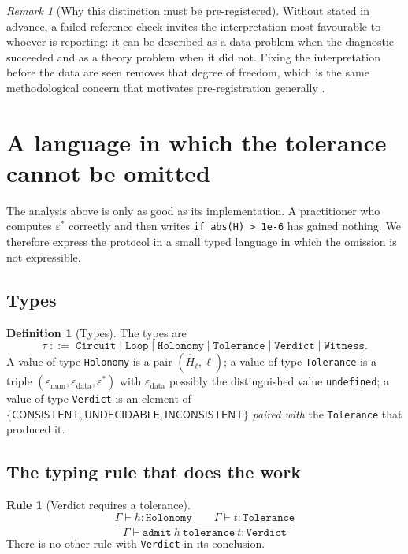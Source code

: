 \documentclass[11pt,twocolumn,a4paper]{article}
\theoremstyle{pstyle}
\theoremstyle{definition}
\newtheorem{definition}[theorem]{Definition}
\newtheorem{rulename}[theorem]{Rule}
\theoremstyle{remark}
\newtheorem{remark}[theorem]{Remark}
\newcommand{\cf}[1]{\texttt{#1}}
\newcommand{\eps}{\varepsilon}
\newcommand{\epsnum}{\eps_{\mathrm{num}}}
\newcommand{\epsdata}{\eps_{\mathrm{data}}}
\newcommand{\epsstar}{\eps^{\ast}}
\newcommand{\hol}{H}
\begin{document}
\begin{remark}[Why this distinction must be pre-registered]
\label{rem:preregister}
Without  stated in advance, a failed reference check
invites the interpretation most favourable to whoever is reporting: it
can be described as a data problem when the diagnostic succeeded and as
a theory problem when it did not. Fixing the interpretation before the
data are seen removes that degree of freedom, which is the same
methodological concern that motivates pre-registration generally
\citep{simmons2011,sandve2013}.
\end{remark}

\section{A language in which the tolerance cannot be omitted}
\label{sec:language}

The analysis above is only as good as its implementation. A
practitioner who computes $\epsstar$ correctly and then writes
\verb|if abs(H) > 1e-6| has gained nothing. We therefore express the
protocol in a small typed language in which the omission is not
expressible.

\subsection{Types}

\begin{definition}[Types]
\label{def:types}
The types are
\[
  \tau \;::=\; \cf{Circuit} \mid \cf{Loop} \mid \cf{Holonomy}
  \mid \cf{Tolerance} \mid \cf{Verdict} \mid \cf{Witness}.
\]
A value of type \cf{Holonomy} is a pair $(\widehat{\hol}_\ell,\ell)$; a
value of type \cf{Tolerance} is a triple
$(\epsnum,\epsdata,\epsstar)$ with $\epsdata$ possibly the distinguished
value \cf{undefined}; a value of type \cf{Verdict} is an element of
$\{\textsf{CONSISTENT},\textsf{UNDECIDABLE},\textsf{INCONSISTENT}\}$
\emph{paired with} the \cf{Tolerance} that produced it.
\end{definition}

\subsection{The typing rule that does the work}

\begin{rulename}[Verdict requires a tolerance]
\label{rule:verdict}
\[
  \frac{\Gamma\vdash h : \cf{Holonomy}
        \qquad \Gamma\vdash t : \cf{Tolerance}}
       {\Gamma\vdash \cf{admit}\ h\ \cf{tolerance}\ t : \cf{Verdict}}
\]
There is no other rule with \cf{Verdict} in its conclusion.
\end{rulename}
\end{document}
